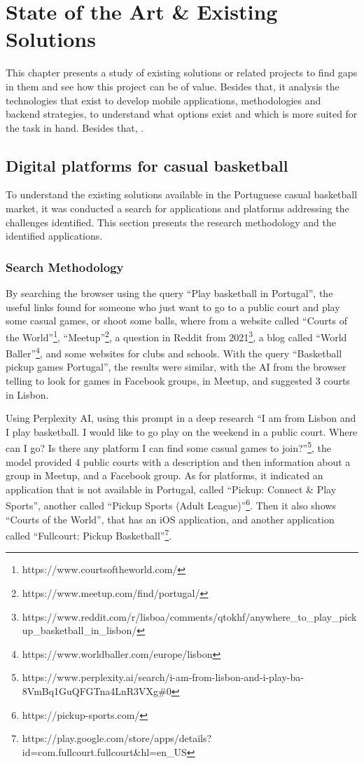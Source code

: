 
\chapter{State of the Art \& Existing Solutions}

This chapter presents a study of existing solutions or related projects to find gaps in them and see how this project can be of value. Besides that, it analysis the technologies that exist to develop mobile applications, methodologies and backend strategies, to understand what options exist and which is more suited for the task in hand. Besides that, .


\section{Digital platforms for casual basketball }

To understand the existing solutions available in the Portuguese casual basketball market, it was conducted a search for applications and platforms addressing the challenges identified. This section presents the research methodology and the identified applications.


\subsection{Search Methodology}
By searching the browser using the query ``Play basketball in Portugal'', the useful links found for someone who just want to go to a public court and play some casual games, or shoot some balls, where from a website called ``Courts of the World''\footnote{https://www.courtsoftheworld.com/}, ``Meetup''\footnote{https://www.meetup.com/find/portugal/}, a question in Reddit from 2021\footnote{https://www.reddit.com/r/lisboa/comments/qtokhf/anywhere\_to\_play\_pickup\_basketball\_in\_lisbon/}, a blog called ``World Baller''\footnote{https://www.worldballer.com/europe/lisbon}, and some websites for clubs and schools.
With the query ``Basketball pickup games Portugal'', the results were similar, with the AI from the browser telling to look for games in Facebook groups, in Meetup, and suggested 3 courts in Lisbon.

Using Perplexity AI, using this prompt in a deep research ``I am from Lisbon and I play basketball.
I would like to go play on the weekend in a public court.
Where can I go?
Is there any platform I can find some casual games to join?''\footnote{https://www.perplexity.ai/search/i-am-from-lisbon-and-i-play-ba-8VmBq1GuQFGTna4LnR3VXg\#0}, the model provided 4 public courts with a description and then information about a group in Meetup, and a Facebook group. As for platforms, it indicated an application that is not available in Portugal, called ``Pickup: Connect \& Play Sports'', another called ``Pickup Sports (Adult League)''\footnote{https://pickup-sports.com/}. Then it also shows ``Courts of the World'', that has an iOS application, and another application called ``Fullcourt: Pickup Basketball''\footnote{https://play.google.com/store/apps/details?id=com.fullcourt.fullcourt\&hl=en\_US}.


